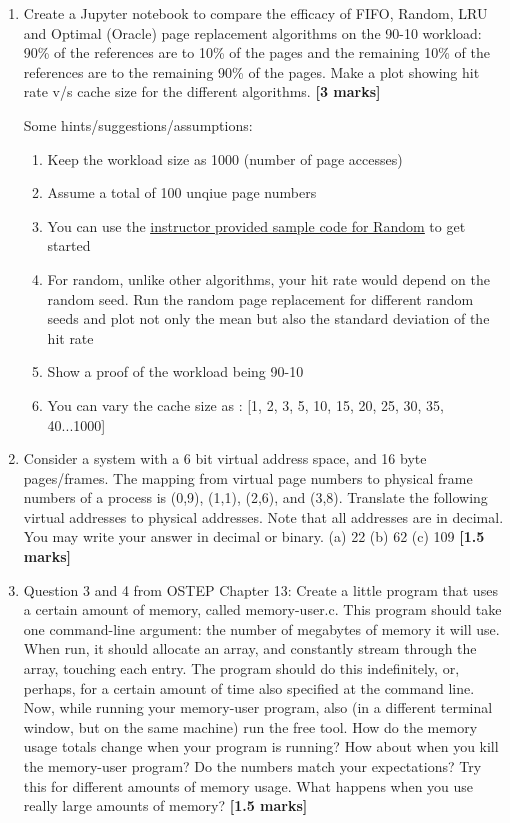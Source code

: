 \documentclass[]{article}
\begin{document}
\begin{enumerate}
	\item Create a Jupyter notebook to compare the efficacy of FIFO, Random, LRU and Optimal (Oracle) page replacement algorithms on the 90-10 workload: 90\% of the references are to 10\% of the pages and the remaining 10\% of the references are to the remaining 90\% of the pages. Make a plot showing hit rate v/s cache size for the different algorithms. \textbf{[3 marks]}
	
	Some hints/suggestions/assumptions:
	\begin{enumerate}
		\item Keep the workload size as 1000 (number of page accesses)
		\item Assume a total of 100 unqiue page numbers
		\item You can use the
		 \underline{\href{https://github.com/nipunbatra/nipunbatra.github.io/blob/master/teaching/os-fall-18/code/replacement-random-plot.py}{instructor provided sample code for Random}} to get started
	\item For random, unlike other algorithms, your hit rate would depend on the random seed. Run the random page replacement for different random seeds and plot not only the mean but also the standard deviation of the hit rate
	\item Show a proof of the workload being 90-10
	\item You can vary the cache size as : [1, 2, 3, 5, 10, 15, 20, 25, 30, 35, 40...1000]
	\end{enumerate}



	
	
	\item Consider a system with a 6 bit virtual address space, and 16 byte pages/frames. The mapping
	from virtual page numbers to physical frame numbers of a process is (0,9), (1,1), (2,6), and
	(3,8). Translate the following virtual addresses to physical addresses. Note that all addresses
	are in decimal. You may write your answer in decimal or binary.  
	(a) 22
	(b) 62
	(c) 109 \textbf{[1.5 marks]}
	
	\item Question 3 and 4 from OSTEP Chapter 13: Create a little program that uses a certain amount of memory, called
	memory-user.c. This program should take one command-line argument:
	the number of megabytes of memory it will use. When run, it should allocate
	an array, and constantly stream through the array, touching each entry.
	The program should do this indefinitely, or, perhaps, for a certain amount
	of time also specified at the command line.
	Now, while running your memory-user program, also (in a different terminal
	window, but on the same machine) run the free tool. How do the
	memory usage totals change when your program is running? How about
	when you kill the memory-user program? Do the numbers match your expectations?
	Try this for different amounts of memory usage. What happens
	when you use really large amounts of memory?  \textbf{[1.5 marks]}
	
\end{enumerate}
\end{document}
